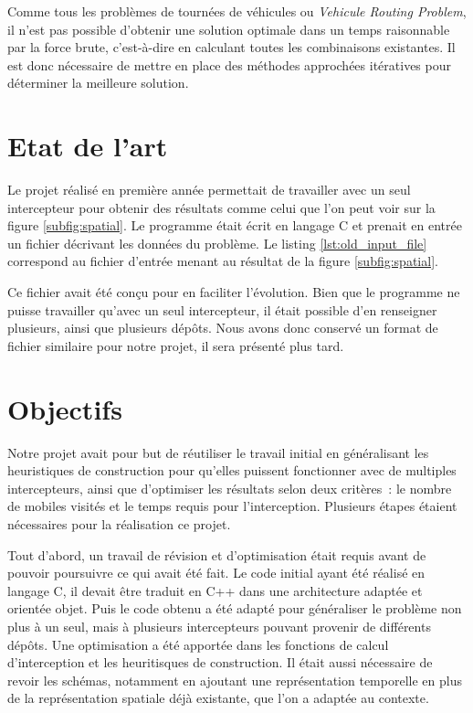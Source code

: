 		Comme tous les problèmes de tournées de véhicules ou \emph{Vehicule Routing Problem}, il n'est pas possible d'obtenir une solution optimale dans un temps raisonnable par la force brute, c'est-à-dire en calculant toutes les combinaisons existantes. Il est donc nécessaire de mettre en place des méthodes approchées itératives pour déterminer la meilleure solution.

	\section{Etat de l'art}

		Le projet réalisé en première année permettait de travailler avec un seul intercepteur pour obtenir des résultats comme celui que l'on peut voir sur la figure \ref{subfig:spatial}. Le programme était écrit en langage C et prenait en entrée un fichier décrivant les données du problème. Le listing \ref{lst:old_input_file} correspond au fichier d'entrée menant au résultat de la figure \ref{subfig:spatial}.

		Ce fichier avait été conçu pour en faciliter l'évolution. Bien que le programme ne puisse travailler qu'avec un seul intercepteur, il était possible d'en renseigner plusieurs, ainsi que plusieurs dépôts. Nous avons donc conservé un format de fichier similaire pour notre projet, il sera présenté plus tard.

		\begin{code}
			\label{lst:old_input_file}
		\end{code}

	\section{Objectifs}
		Notre projet avait pour but de réutiliser le travail initial en généralisant les heuristiques de construction pour qu'elles puissent fonctionner avec de multiples intercepteurs, ainsi que d'optimiser les résultats selon deux critères : le nombre de mobiles visités et le temps requis pour l'interception.
Plusieurs étapes étaient nécessaires pour la réalisation ce projet.

		Tout d'abord, un travail de révision et d'optimisation était requis avant de pouvoir poursuivre ce qui avait été fait. Le code initial ayant été réalisé en langage C, il devait être traduit en C++ dans une architecture adaptée et orientée objet. Puis le code obtenu a été adapté pour généraliser le problème non plus à un seul, mais à plusieurs intercepteurs pouvant provenir de différents dépôts. Une optimisation a été apportée dans les fonctions de calcul d'interception et les heuritisques de construction. Il était aussi nécessaire de revoir les schémas, notamment en ajoutant une représentation temporelle en plus de la représentation spatiale déjà existante, que l'on a adaptée au contexte.


